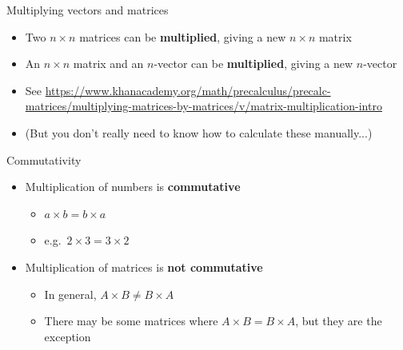 \begin{frame}{Multiplying vectors and matrices}
	\begin{itemize}
		\pause\item Two $n \times n$ matrices can be \textbf{multiplied}, giving a new $n \times n$ matrix
		\pause\item An $n \times n$ matrix and an $n$-vector can be \textbf{multiplied}, giving a new $n$-vector
		\pause\item See \url{https://www.khanacademy.org/math/precalculus/precalc-matrices/multiplying-matrices-by-matrices/v/matrix-multiplication-intro}
		\pause\item (But you don't really need to know how to calculate these manually...)
	\end{itemize}
\end{frame}

\begin{frame}{Commutativity}
	\begin{itemize}
		\pause\item Multiplication of numbers is \textbf{commutative}
			\begin{itemize}
				\pause\item $a \times b = b \times a$
				\pause\item e.g.\ $2 \times 3 = 3 \times 2$
			\end{itemize}
		\pause\item Multiplication of matrices is \textbf{not commutative}
			\begin{itemize}
				\pause\item In general, $A \times B \neq B \times A$
				\pause\item There may be some matrices where $A \times B = B \times A$, but they are the exception
			\end{itemize}
	\end{itemize}
\end{frame}

